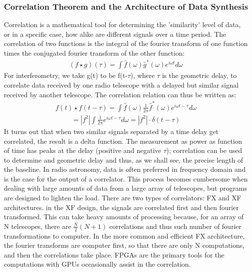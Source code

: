 \documentclass{article}
\begin{document}
\subsubsection{Correlation Theorem and the Architecture of Data Synthesis}
Correlation is a mathematical tool for determining the 'similarity'
level of data, or in a specific case, how alike are different signals
over a time period. The correlation of two functions is the integral of
the fourier transform of one function times the conjugated fourier
transform of the other function:
\begin{align}(f\star{g})(\tau) =
  \int{\hat{f}(\omega)\hat{g}^{\ast}(\omega)e^{i\omega{t}} d\omega}
\end{align}
For interferometry, we take g(t) to be f(t-$\tau$), where $\tau$ is the
geometric delay, to correlate data received by one radio telescope with
a delayed but similar signal received by another telescope. The
correlation relation can thus be written as:
\begin{align}f(t)\star{f(t-\tau)} =
  \int{\hat{f}(\omega)\frac{1}{2\pi}\hat{f}^{\ast}(\omega)e^{i\omega{t-\tau}}
    d\omega}
\end{align}
\begin{align}=\left|{f}^{2}\right|\int{\frac{1}{2\pi}e^{i\omega{t-\tau}}d\omega} 
  =\left|{f}^{2}\right|\cdot\delta(t-\tau)
\end{align}
It turns out that when two similar signals separated by a time delay get
correlated, the result is a delta function. The measurement as power as
function of time has peaks at the delay (positive and negative $\tau$);
correlation can be used to determine and geometric delay and thus, as we
shall see, the precise length of the baseline. In radio astronomy, data
is often preferred in frequency domain and is the case for the output of
a correlator. This process becomes cumbersome when dealing with large 
amounts of data from a large array of telescopes, but programs are
designed to lighten the load. There are two types of correlators: FX and 
XF architectures. in the XF design, the signals are correlated first and
then fourier transformed. This can take heavy amounts of processing
because, for an array of N telescopes, there are $\frac{N}{2}(N+1)$
correlations and thus such number of fourier transformations to
computer. In the more common and efficient FX architecture, the fourier
transforms are computer first, so that there are only N computations,
and then the correlations take place. FPGAs are the primary tools for
the computations with GPUs occasionally assist in the correlation.
\end{document}
